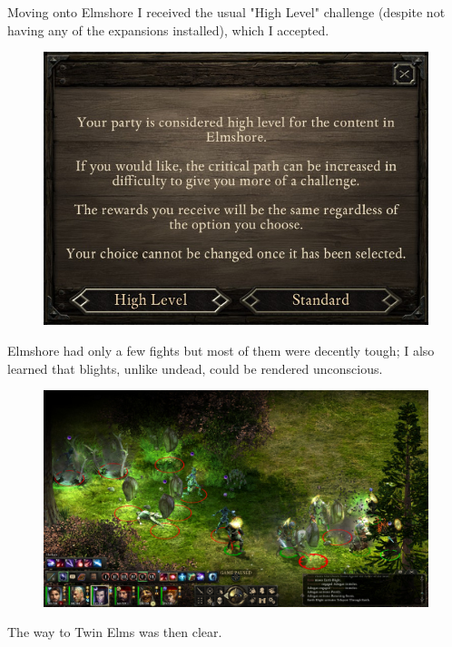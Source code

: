 \documentclass{article}
\begin{document}
Moving onto Elmshore I received the usual "High Level" challenge (despite not having any of the expansions installed), which I accepted.

\begin{figure}
\includegraphics[scale=0.7]{files/blog/2019_03_04_pillars_of_eternity_path_of_the_damned_act_iii/2019_03_04_highlevel.jpg}
\end{figure}

Elmshore had only a few fights but most of them were decently tough; I also learned that blights, unlike undead, could be rendered unconscious.

\begin{figure}
\includegraphics[scale=0.33]{files/blog/2019_03_04_pillars_of_eternity_path_of_the_damned_act_iii/2019_03_04_elmshore.jpg}
\end{figure}

The way to Twin Elms was then clear.
\end{document}
